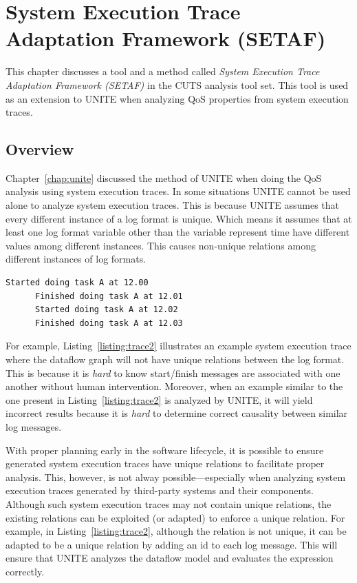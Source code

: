 
\chapter{System Execution Trace Adaptation Framework (SETAF)}
\label{chap:setaf}

This chapter discusses a tool and a method called \textit{System 
Execution Trace Adaptation Framework (SETAF)} in the CUTS  analysis 
tool set. This tool is used as an extension to UNITE when analyzing QoS 
properties from system execution traces.

\section{Overview}
\label{sec:setaf-overview}

Chapter~\ref{chap:unite} discussed the method of UNITE when doing the 
QoS analysis using system execution traces. In some situations UNITE cannot 
be used alone to analyze system execution traces. This is because UNITE 
assumes that every different instance of a log format is unique. Which means 
it assumes that at least one log format variable other than the variable represent 
time have different values among different instances. This causes non-unique 
relations among different instances of log formats.

\begin{lstlisting}[label=listing:trace2, 
caption=Portion of a system execution trace that does not 
contain unique relations ., captionpos=b]
      Started doing task A at 12.00
      Finished doing task A at 12.01
      Started doing task A at 12.02
      Finished doing task A at 12.03
\end{lstlisting}

For example, Listing~\ref{listing:trace2} illustrates 
an example system execution trace where the dataflow graph
will not have unique relations between the log format. This 
is because it is \textit{hard} to know start/finish messages 
are associated with one another without human intervention.
Moreover, when an example similar to the one present in 
Listing~\ref{listing:trace2} is analyzed by UNITE, it 
will yield incorrect results because it is \textit{hard} to 
determine correct causality between similar log messages.

With proper planning early in the software lifecycle, it is
possible to ensure generated system execution traces have unique
relations to facilitate proper analysis. This, however, is not
alway possible---especially when analyzing system execution traces
generated by third-party systems and their components. Although
such system execution traces may not contain unique 
relations, the existing relations can be exploited (or adapted) 
to enforce a unique relation. For example, in 
Listing~\ref{listing:trace2}, although the relation is 
not unique, it can be adapted to be a unique relation by adding 
an id to each log message. This will ensure that UNITE analyzes 
the dataflow model and evaluates the expression correctly. 

